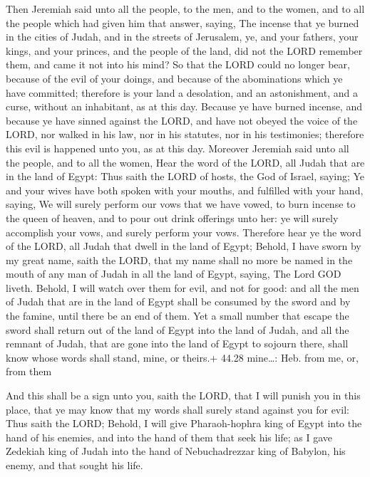  Then Jeremiah said unto all the people, to the men, and
to the women, and to all the people which had given him that answer,
saying,  The incense that ye burned in the cities of Judah,
and in the streets of Jerusalem, ye, and your fathers, your kings, and
your princes, and the people of the land, did not the LORD remember
them, and came it not into his mind?  So that the LORD
could no longer bear, because of the evil of your doings, and because of
the abominations which ye have committed; therefore is your land a
desolation, and an astonishment, and a curse, without an inhabitant, as
at this day.  Because ye have burned incense, and because
ye have sinned against the LORD, and have not obeyed the voice of the
LORD, nor walked in his law, nor in his statutes, nor in his
testimonies; therefore this evil is happened unto you, as at this day.
 Moreover Jeremiah said unto all the people, and to all the
women, Hear the word of the LORD, all Judah that are in the land of
Egypt:  Thus saith the LORD of hosts, the God of Israel,
saying; Ye and your wives have both spoken with your mouths, and
fulfilled with your hand, saying, We will surely perform our vows that
we have vowed, to burn incense to the queen of heaven, and to pour out
drink offerings unto her: ye will surely accomplish your vows, and
surely perform your vows.  Therefore hear ye the word of
the LORD, all Judah that dwell in the land of Egypt; Behold, I have
sworn by my great name, saith the LORD, that my name shall no more be
named in the mouth of any man of Judah in all the land of Egypt, saying,
The Lord GOD liveth.  Behold, I will watch over them for
evil, and not for good: and all the men of Judah that are in the land of
Egypt shall be consumed by the sword and by the famine, until there be
an end of them.  Yet a small number that escape the sword
shall return out of the land of Egypt into the land of Judah, and all
the remnant of Judah, that are gone into the land of Egypt to sojourn
there, shall know whose words shall stand, mine, or theirs.+ 44.28
mine\ldots: Heb. from me, or, from them

 And this shall be a sign unto you, saith the LORD, that
I will punish you in this place, that ye may know that my words shall
surely stand against you for evil:  Thus saith the LORD;
Behold, I will give Pharaoh-hophra king of Egypt into the hand of his
enemies, and into the hand of them that seek his life; as I gave
Zedekiah king of Judah into the hand of Nebuchadrezzar king of Babylon,
his enemy, and that sought his life.

